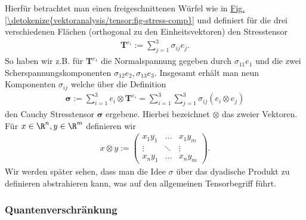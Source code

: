 \documentclass[letterpaper,10pt,english]{jupyterBook}
\begin{document}
\sphinxAtStartPar
Hierfür betrachtet man einen freigeschnittenen Würfel wie in \hyperref[\detokenize{vektoranalysis/tensor:fig-stress-comp}]{Fig.\@ \ref{\detokenize{vektoranalysis/tensor:fig-stress-comp}}} und definiert für die drei verschiedenen Flächen (orthogonal zu den Einheitsvektoren) den Stresstensor
\begin{equation*}
\begin{split}\mathbf{T}^{e_i}:= \sum_{j=1}^3 \sigma_{ij} e_j.\end{split}
\end{equation*}
\sphinxAtStartPar
So haben wir z.B. für \(\mathbf{T}^{e_1}\) die Normalspannung gegeben durch \(\sigma_{11} e_1\) und die zwei Scherspannungskomponenten \(\sigma_{12} e_2, \sigma_{13} e_3\). Insgesamt erhält man neun Komponenten \(\sigma_{ij}\) welche über die Definition
\begin{equation*}
\begin{split}\mathbf{\sigma} := \sum_{i=1}^3 e_i \otimes \mathbf{T}^{e_i} = \sum_{i=1}^3\sum_{j=1}^3 \sigma_{ij} (e_i\otimes e_j)\end{split}
\end{equation*}
\sphinxAtStartPar
den Cauchy Stresstensor \(\mathbf{\sigma}\) ergebene. Hierbei bezeichnet \(\otimes\) das  zweier Vektoren. Für \(x\in\R^n,y\in\R^m\) definieren wir
\begin{equation*}
\begin{split}x \otimes y := 
\begin{pmatrix}
x_1y_1 &\ldots &x_1 y_m\\
\vdots &\ddots & \vdots\\
x_n y_1&\ldots& x_n y_m
\end{pmatrix}.\end{split}
\end{equation*}
\sphinxAtStartPar
Wir werden später sehen, dass man die Idee \(\sigma\) über das dyadische Produkt zu definieren abstrahieren kann, was auf den allgemeinen Tensorbegriff führt.


\subsubsection{Quantenverschränkung}
\label{\detokenize{vektoranalysis/tensor:quantenverschrankung}}
\end{document}
